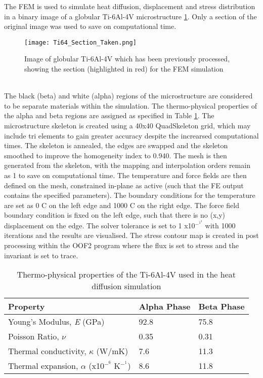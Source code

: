 \documentclass[report.tex]{subfiles}
\begin{document}
The FEM is used to simulate heat diffusion, displacement and stress distribution in a binary image of a globular Ti-6Al-4V microstructure \ref{fig:FinalSimulationInput}. Only a section of the original image was used to save on computational time.
\\
\begin{figure}[h!]
    \centering
    \texttt{[image: Ti64\_Section\_Taken.png]}
    \caption{Image of globular Ti-6Al-4V which has been previously processed, showing the section (highlighted in red) for the FEM simulation}
    \label{fig:FinalSimulationInput}
\end{figure}
\\
The black (beta) and white (alpha) regions of the microstructure are considered to be separate materials within the simulation. The thermo-physical properties of the alpha and beta regions are assigned as specified in Table \ref{tab:Ti64Properties}. The microstructure skeleton is created using a 40x40 QuadSkeleton grid, which may include tri elements to gain greater accuracy despite the increarsed computational times. The skeleton is annealed, the edges are swapped and the skeleton smoothed to improve the homogeneity index to 0.940. The mesh is then generated from the skeleton, with the mapping and interpolation orders remain as 1 to save on computational time. The temperature and force fields are then defined on the mesh, constrained in-plane as active (such that the FE output contains the specified parameters). The boundary conditions for the temperature are set as 0 \degree C on the left edge and 1000 \degree C on the right edge. The force field boundary condition is fixed on the left edge, such that there is no (x,y) displacement on the edge. The solver tolerance is set to 1 x10$^-^1^3$ with 1000 iterations and the results are visualised. The stress contour map is created in post processing within the OOF2 program where the flux is set to stress and the invariant is set to trace.

\begin{center}
  \begin{table}[h!]
  \caption{\label{tab:Ti64Properties}Thermo-physical properties of the Ti-6Al-4V used in the heat diffusion simulation}
  \begin{center}
  \begin{tabular}{|p{6cm}|p{3cm}|p{3cm}|}
  \hline
  \textbf{Property} &\textbf{Alpha Phase} &\textbf{Beta Phase}\\
  \hline
  Young's Modulus, \textit{E} (GPa) & 92.8 & 75.8 \\
   \hline
   Poisson Ratio, $\nu$ & 0.35 & 0.31 \\
   \hline
   Thermal conductivity, $\kappa$ (W/mK) & 7.6 & 11.3 \\
   \hline
   Thermal expansion, $\alpha$ (x10$^-^6$ K$^-^1$) & 8.6 & 11.8 \\
   \hline  
  \end{tabular}
  \end{center}
  \end{table}
\end{center}
\end{document}
